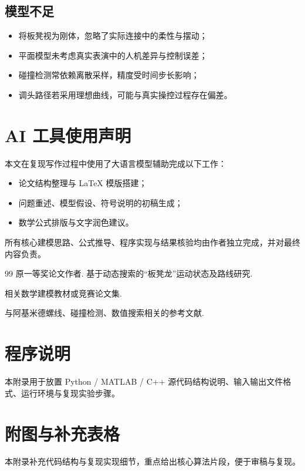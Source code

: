 \documentclass[12pt,a4paper]{ctexart}
\begin{document}
\subsection{模型不足}
\begin{itemize}[leftmargin=2em]
    \item 将板凳视为刚体，忽略了实际连接中的柔性与摆动；
    \item 平面模型未考虑真实表演中的人机差异与控制误差；
    \item 碰撞检测常依赖离散采样，精度受时间步长影响；
    \item 调头路径若采用理想曲线，可能与真实操控过程存在偏差。
\end{itemize}

\section{AI 工具使用声明}
本文在复现写作过程中使用了大语言模型辅助完成以下工作：
\begin{itemize}[leftmargin=2em]
    \item 论文结构整理与 LaTeX 模版搭建；
    \item 问题重述、模型假设、符号说明的初稿生成；
    \item 数学公式排版与文字润色建议。
\end{itemize}
所有核心建模思路、公式推导、程序实现与结果核验均由作者独立完成，并对最终内容负责。

\begin{thebibliography}{99}
原一等奖论文作者. 基于动态搜索的“板凳龙”运动状态及路线研究.

相关数学建模教材或竞赛论文集.

与阿基米德螺线、碰撞检测、数值搜索相关的参考文献.
\end{thebibliography}

\appendix

\section{程序说明}
本附录用于放置 Python / MATLAB / C++ 源代码结构说明、输入输出文件格式、运行环境与复现实验步骤。

\section{附图与补充表格}
本附录补充代码结构与复现实现细节，重点给出核心算法片段，便于审稿与复现。
\end{document}
